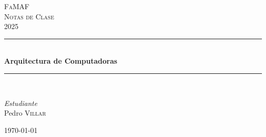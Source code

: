 \begin{titlepage} 
	\newcommand{\HRule}{\rule{\linewidth}{0.5mm}}
	
	\center 
	
	
	\textsc{\LARGE FaMAF}\\[1.5cm] 
	
	\textsc{\Large Notas de Clase}\\[0.5cm] 
	
	\textsc{\large 2025}\\[0.5cm] 
	
	
	\HRule\\[0.4cm]
	
	{\huge\bfseries Arquitectura de Computadoras}\\[0.4cm] 
	
	\HRule\\[1.5cm]
	
	
	\begin{minipage}{0.4\textwidth}
		\begin{flushleft}
			\large
			\textit{Estudiante}\\
			Pedro \textsc{Villar} 
		\end{flushleft}
	\end{minipage}
	
	
	
	\vfill\vfill\vfill 
	
	{\large\today} 

	
	
	\vfill 
	
\end{titlepage}